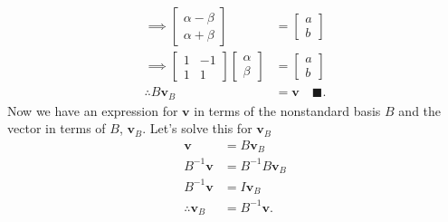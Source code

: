 \documentclass{report}
\begin{document}
\begin{itemize}
\begin{align*}
                \implies \begin{bmatrix} \alpha - \beta  \\ \alpha + \beta\end{bmatrix} &= \begin{bmatrix} a \\b \end{bmatrix} \\
                \implies \begin{bmatrix} 1 & -1 \\ 1 & 1 \end{bmatrix} \begin{bmatrix} \alpha \\ \beta \end{bmatrix} &= \begin{bmatrix}a \\ b \end{bmatrix} \\
                \therefore B\mathbf{v}_{B} &= \mathbf{v} \quad \blacksquare
            .\end{align*}
            \bigbreak \noindent 
            Now we have an expression for $\mathbf{v}$ in terms of the nonstandard basis $B$ and the vector in terms of $B$, $\mathbf{v}_{B}$. Let's solve this for $\mathbf{v}_{B} $
            \begin{align*}
                \mathbf{v} &= B\mathbf{v}_{B} \\
                B^{-1}\mathbf{v} &= B^{-1}B\mathbf{v}_{B} \\
                B^{-1}\mathbf{v} & = I\mathbf{v}_{B} \\
                \therefore \mathbf{v}_{B} &= B^{-1}\mathbf{v}
         .\end{align*}


\end{itemize}
\end{document}
